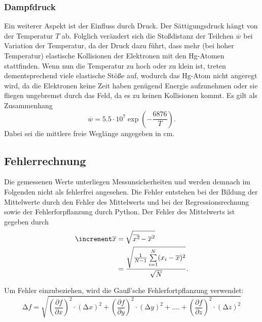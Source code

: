 \subsubsection{Dampfdruck}
Ein weiterer Aspekt ist der Einfluss durch Druck. Der Sättigungsdruck hängt von 
der Temperatur $T$ ab. Folglich verändert sich die Stoßdistanz der Teilchen 
$\overline{w}$ bei Variation der Temperatur, da der Druck dazu führt, dass 
mehr (bei hoher Temperatur) elastische Kollisionen der Elektronen mit den 
Hg-Atomen stattfinden. Wenn nun die Temperatur zu hoch oder zu klein ist, 
treten dementsprechend viele elastische Stöße auf, wodurch das Hg-Atom 
nicht angeregt wird, da die Elektronen keine Zeit haben genügend Energie 
aufzunehmen oder sie fliegen ungebremst durch das Feld, da es zu keinen 
Kollisionen kommt. Es gilt als Zusammenhang
\begin{equation}
    \label{eqn:6}
    \overline{w} = 5.5 \cdot 10^7 \exp \left(-\frac{6876}{T} \right).
\end{equation}
\noindent Dabei sei die mittlere freie Weglänge angegeben in $\unit{\centi\meter}$.

\subsection{Fehlerrechnung}
Die gemessenen Werte unterliegen Messunsicherheiten und werden demnach im
Folgenden nicht als fehlerfrei angesehen. Die Fehler entstehen bei der
Bildung der Mittelwerte durch den Fehler des Mittelwerts und bei der
Regressionsrechnung sowie der Fehlerforpflanzung durch Python.
Der Fehler des Mittelwerts ist gegeben durch 
\begin{equation}
    \begin{aligned}
        \increment \overline{x} &= \sqrt{\overline{x^2\kern-0.1em} - \overline{x}^2} \\
                            &= \frac{\sqrt{\frac{1}{N-1} \sum\limits_{i=1}^N (x_i - \overline{x})^2}}{\sqrt{N}}.
    \end{aligned}
\end{equation}

Um Fehler einzubeziehen, wird die Gauß'sche Fehlerfortpflanzung verwendet:
\begin{equation}
    \label{eqn:9}
    \increment f = \sqrt{\left(\frac{\partial f}{\partial x}\right)^2 \cdot \left(\increment x\right)^2 + \left(\frac{\partial f}{\partial y}\right)^2 \cdot \left(\increment y\right)^2 + .... + \left(\frac{\partial f}{\partial z}\right)^2 \cdot \left(\increment z\right)^2}
\end{equation}